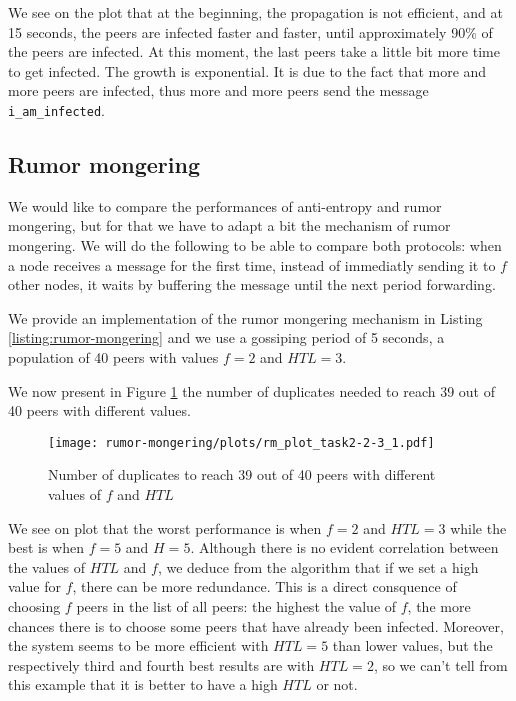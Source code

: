 \documentclass[a4paper, 11pt]{article}
\theoremstyle{plain}
\theoremstyle{definition}
\begin{document}
    We see on the plot that at the beginning, the propagation is not efficient, and at 15 seconds, the peers
    are infected faster and faster, until approximately 90\% of the peers are infected. At this moment, the
    last peers take a little bit more time to get infected. The growth is exponential. It is due to the fact
    that more and more peers are infected, thus more and more peers send the message \texttt{i\_am\_infected}.


  \subsection{Rumor mongering}
  \label{sec:rumor-mongering}

  We would like to compare the performances of anti-entropy and rumor mongering, but for that we have to adapt
  a bit the mechanism of rumor mongering. We will do the following to be able to compare both protocols: when
  a node receives a message for the first time, instead of immediatly sending it to $f$ other nodes, it waits
  by buffering the message until the next period forwarding.

  We provide an implementation of the rumor mongering mechanism in Listing \ref{listing:rumor-mongering} and we use a gossiping period
  of 5 seconds, a population of 40 peers with values $f = 2$ and $HTL=3$.

  

  We now present in Figure \ref{fig:task2-2-3} the number of duplicates needed to reach 39 out of 40 peers
  with different values.

  \begin{figure}[h]
    \centering
    \texttt{[image: rumor-mongering/plots/rm\_plot\_task2-2-3\_1.pdf]}
    \caption{Number of duplicates to reach 39 out of 40 peers with different values of $f$ and $HTL$}
    \label{fig:task2-2-3}
  \end{figure}

  We see on plot that the worst performance is when $f = 2$ and $HTL = 3$ while the best is when $f = 5$ and
  $H=5$. Although there is no evident correlation between the values of $HTL$ and $f$, we deduce from the
  algorithm that if we set a high value for $f$, there can be more redundance. This is a direct consquence of
  choosing $f$ peers in the list of all peers: the highest the value of $f$, the more chances there is to
  choose some peers that have already been infected. Moreover, the system seems to be more efficient with $HTL =
  5$ than lower values, but the respectively third and fourth best results are with $HTL = 2$, so we can't
  tell from this example that it is better to have a high $HTL$ or not. 
\end{document}
